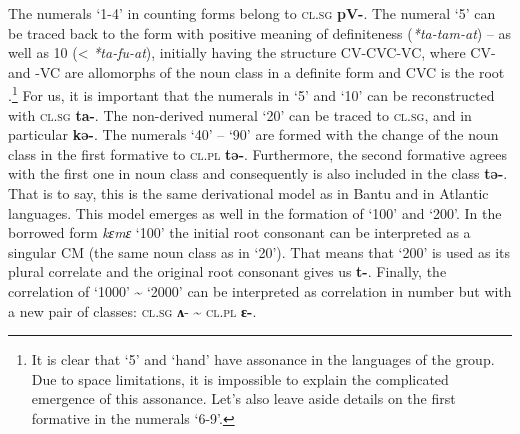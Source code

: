 \begin{table}
\caption{\label{tab:1:15} Noun classes in Temne numerals}
\end{table}

The numerals ‘1-4’ in counting forms belong to \textsc{cl}.\textsc{sg} \textbf{pV-}. The numeral ‘5’ can be traced back to the form with positive meaning of definiteness (\textit{*ta-tam-at}) – as well as 10 (< \textit{*ta-fu-at}), initially having the structure CV-CVC-VC, where CV-  and  -VC  are allomorphs of the noun class in a definite form and CVC is the root \citep[143-144]{Pozdniakov1993}.\footnote{It is clear that `5' and `hand' have assonance in the languages of the group. Due to space limitations, it is impossible to explain the complicated emergence of this assonance. Let's also leave aside details on the first formative in the numerals ‘6-9’.} For us, it is important that the numerals in ‘5’ and ‘10’ can be reconstructed with \textsc{cl}.\textsc{sg} \textbf{ta-}. The non-derived numeral `20' can be traced to \textsc{cl}.\textsc{sg}, and  in particular \textbf{kə-}. The numerals ‘40’ – ‘90’ are formed with the change of the noun class in the first formative to \textsc{cl}.\textsc{pl} \textbf{tə-}. Furthermore, the second formative agrees with the first one in noun class and consequently is also included in the class \textbf{tə-}. That is to say, this is the same derivational model as in Bantu and in Atlantic languages. This model emerges as well in the formation of ‘100’ and ‘200’. In the borrowed form \textit{kɛmɛ} ‘100’ the initial root consonant can be interpreted as a singular CM (the same noun class as in ‘20’). That means that ‘200’ is used as its plural correlate and the original root consonant gives us \textbf{t-}. Finally, the correlation of ‘1000’ {\textasciitilde} ‘2000’ can be interpreted as correlation in number but with a new pair of classes: \textsc{cl}.\textsc{sg} \textbf{ʌ}- {\textasciitilde} \textsc{cl}.\textsc{pl} \textbf{ɛ-}.

